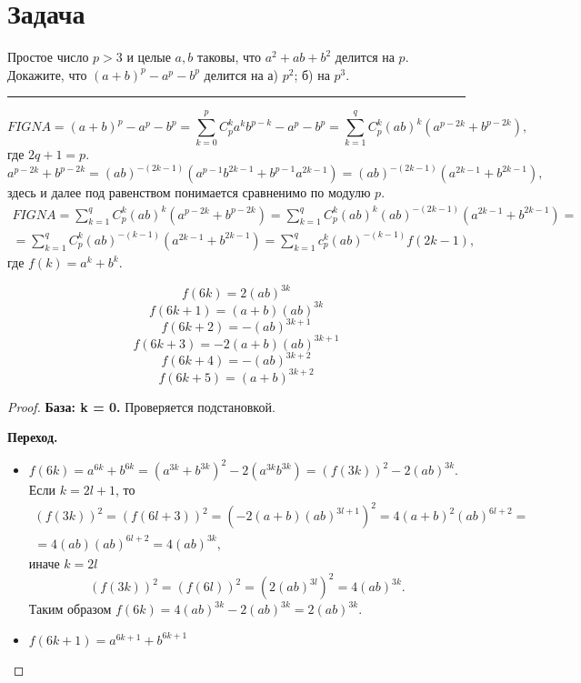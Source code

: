\section{Задача}

Простое число $p > 3$ и целые $a, b$ таковы, что $a^2 + ab + b^2$ делится на $p$. Докажите, что $(a + b)^p - a^p - b^p$ делится на а) $p^2$; б) на $p^3$.

\hrule

\begin{equation*}
FIGNA = (a + b)^p - a^p - b^p = \sum_{k=0}^p{C_p^k a^k b^{p-k}} - a^p - b^p = \sum_{k=1}^{q}{C_p^k (ab)^k(a^{p-2k} + b^{p - 2k})},
\end{equation*}
где $2q + 1 = p$.
\begin{equation*}
a^{p - 2k} + b^{p - 2k} = (ab)^{-(2k - 1)}(a^{p-1}b^{2k - 1} + b^{p-1}a^{2k - 1}) = (ab)^{-(2k-1)}(a^{2k-1} + b^{2k-1}),
\end{equation*}
здесь и далее под равенством понимается сравненимо по модулю $p$.
\begin{multline*}
FIGNA = \sum_{k=1}^q{C_p^k (ab)^k (a^{p-2k} + b^{p-2k})} = \sum_{k=1}^q{C_p^k (ab)^k (ab)^{-(2k-1)}(a^{2k-1} + b^{2k-1})} = \\
= \sum_{k=1}^q{C_p^k (ab)^{-(k-1)}(a^{2k-1} + b^{2k-1})} = \sum_{k=1}^q{c_p^k (ab)^{-(k-1)} f(2k-1)},
\end{multline*}
где $f(k) = a^{k} + b^{k}$.

{\theorem 
$$ f(6k)    = 2(ab)^{3k}        $$
$$ f(6k+1)  = (a+b)(ab)^{3k}    $$
$$ f(6k+2)  = -(ab)^{3k+1}      $$
$$ f(6k+3)  = -2(a+b)(ab)^{3k+1}$$
$$ f(6k+4)  = -(ab)^{3k+2}      $$
$$ f(6k+5)  = (a+b)^{3k+2}      $$
}
\begin{proof}

{\bfseries База: k = 0.}
Проверяется подстановкой.

{\bfseries Переход. }
\begin{itemize}
    \item $ f(6k) = a^{6k} + b^{6k} = (a^{3k} + b^{3k})^2 - 2(a^{3k}b^{3k}) = (f(3k))^2 - 2(ab)^{3k}. $ Если $k = 2l + 1$, то 
        \begin{multline*}
            (f(3k))^2 = (f(6l+3))^2 = (-2(a+b)(ab)^{3l+1})^2 = 4(a+b)^2(ab)^{6l+2} = \\
            = 4(ab)(ab)^{6l+2} = 4(ab)^{3k},
        \end{multline*}
        иначе $k = 2l$
            $$(f(3k))^2 = (f(6l))^2 = (2(ab)^{3l})^2 = 4(ab)^{3k}.$$ 
        Таким образом $f(6k) = 4(ab)^{3k} - 2(ab)^{3k} = 2(ab)^{3k}$. 
    \item $ f(6k+1) = a^{6k+1} + b^{6k+1} $
\end{itemize}

\end{proof}
